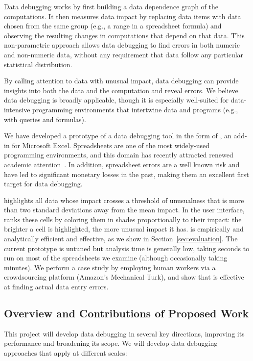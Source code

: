 Data debugging works by first building a data dependence graph of the
computations. It then measures data impact by replacing data items
with data chosen from the same group (e.g., a range in a spreadsheet
formula) and observing the resulting changes in computations that
depend on that data. This non-parametric approach allows data
debugging to find errors in both numeric and non-numeric data, without
any requirement that data follow any particular statistical
distribution.

By calling attention to data with unusual impact, data debugging can
provide insights into both the data and the computation and reveal
errors. We believe data debugging is broadly applicable, though it is
especially well-suited for data-intensive programming environments that intertwine
data and programs (e.g., with queries and formulas).

We have developed a prototype of a data debugging tool in the form
of \checkcell{}, an add-in for Microsoft Excel. Spreadsheets are one
of the most widely-used programming environments, and this domain has
recently attracted renewed academic
attention~\cite{DBLP:conf/popl/Gulwani11,DBLP:conf/pldi/HarrisG11,Singh:2012:LSS:2212351.2212356}.
In addition, spreadsheet errors are a well known risk and have led to
significant monetary losses in the past, making them an excellent
first target for data debugging.

\checkcell{} highlights all data whose impact crosses a threshold of
unusualness that is more than two standard deviations away from the
mean impact.  In the user interface, \checkcell{} ranks these cells by
coloring them in shades proportionally to their impact: the brighter a
cell is highlighted, the more unusual impact it has. \checkcell{} is
empirically and analytically efficient and effective, as we show in
Section~\ref{sec:evaluation}. The current prototype is untuned but
analysis time is generally low, taking seconds to run on most of the
spreadsheets we examine (although occasionally taking minutes). We
perform a case study by employing human workers via a crowdsourcing
platform (Amazon's Mechanical Turk), and show that \checkcell{} is
effective at finding actual data entry errors.

\subsection*{Overview and Contributions of Proposed Work}

This project will develop data debugging in several key directions,
improving its performance and broadening its scope. We will develop
data debugging approaches that apply at different scales:

